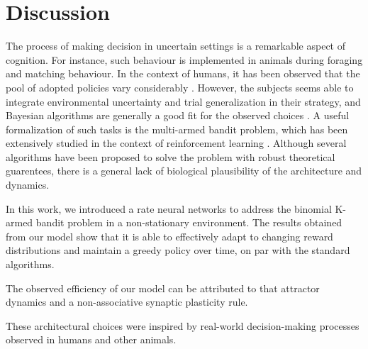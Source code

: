 
\section{Discussion}


The process of making decision in uncertain settings is a remarkable aspect of cognition. For instance, such behaviour is implemented in animals during foraging and matching behaviour.
In the context of humans, it has been observed that the pool of adopted policies vary considerably \cite{steyversBayesianAnalysisHuman2009a}. However, the subjects seems able to integrate environmental uncertainty and trial generalization in their strategy, and Bayesian algorithms are generally a
good fit for the observed choices \cite{schulzFindingStructureMultiarmed2020, zhangForgetfulBayesMyopic2013}.
A useful formalization of such tasks is the multi-armed bandit problem, which has been extensively studied in the context of reinforcement learning \cite{suttonReinforcementLearningProblem1998}.
Although several algorithms have been proposed to solve the problem with robust theoretical guarentees, there is a general lack of biological plausibility of the architecture and dynamics.

%
In this work, we introduced a rate neural networks to address the binomial K-armed bandit problem in a non-stationary environment.
The results obtained from our model show that it is able to effectively adapt to changing reward distributions and maintain a greedy policy over time, on par with the standard algorithms.

The observed efficiency of our model can be attributed to that attractor dynamics and a non-associative synaptic plasticity rule.

These architectural choices were inspired by real-world decision-making processes observed in humans and other animals.


